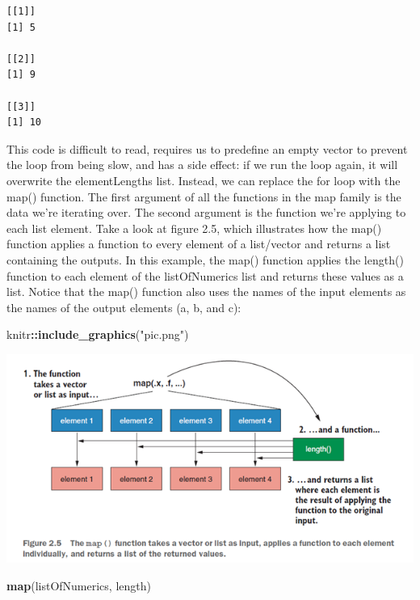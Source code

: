 \documentclass[
]{article}
\newenvironment{Shaded}{\begin{snugshade}}{\end{snugshade}}
\newcommand{\FunctionTok}[1]{\textcolor[rgb]{0.13,0.29,0.53}{\textbf{#1}}}
\newcommand{\NormalTok}[1]{#1}
\newcommand{\SpecialCharTok}[1]{\textcolor[rgb]{0.81,0.36,0.00}{\textbf{#1}}}
\newcommand{\StringTok}[1]{\textcolor[rgb]{0.31,0.60,0.02}{#1}}
\begin{document}
\begin{verbatim}
[[1]]
[1] 5

[[2]]
[1] 9

[[3]]
[1] 10
\end{verbatim}

This code is difficult to read, requires us to predefine an empty vector
to prevent the loop from being slow, and has a side effect: if we run
the loop again, it will overwrite the elementLengths list. Instead, we
can replace the for loop with the map() function. The first argument of
all the functions in the map family is the data we're iterating over.
The second argument is the function we're applying to each list element.
Take a look at figure 2.5, which illustrates how the map() function
applies a function to every element of a list/vector and returns a list
containing the outputs. In this example, the map() function applies the
length() function to each element of the listOfNumerics list and returns
these values as a list. Notice that the map() function also uses the
names of the input elements as the names of the output elements (a, b,
and c):

\begin{Shaded}
\begin{Highlighting}[]
\NormalTok{knitr}\SpecialCharTok{::}\FunctionTok{include\_graphics}\NormalTok{(}\StringTok{"pic.png"}\NormalTok{)}
\end{Highlighting}
\end{Shaded}

\includegraphics[width=8.67in]{pic}

\begin{Shaded}
\begin{Highlighting}[]
\FunctionTok{map}\NormalTok{(listOfNumerics, length)}
\end{Highlighting}
\end{Shaded}
\end{document}
